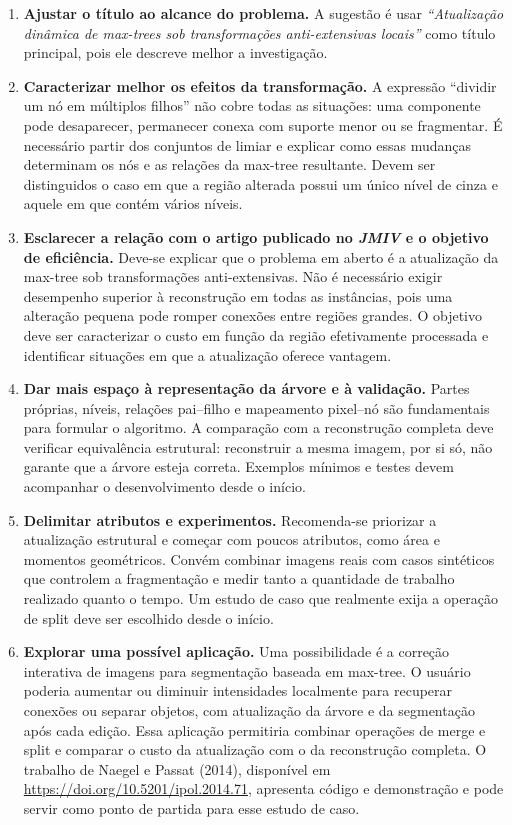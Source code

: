 \documentclass[11pt,a4paper]{article}
\theoremstyle{definition}
\begin{document}
\begin{enumerate}
  \item \textbf{Ajustar o título ao alcance do problema.} A sugestão é usar
  \emph{“Atualização dinâmica de max-trees sob transformações
  anti-extensivas locais”} como título principal, pois ele descreve melhor a
  investigação.

  \item \textbf{Caracterizar melhor os efeitos da transformação.} A expressão
  “dividir um nó em múltiplos filhos” não cobre todas as situações: uma
  componente pode desaparecer, permanecer conexa com suporte menor ou se
  fragmentar. É necessário partir dos conjuntos de limiar e explicar como
  essas mudanças determinam os nós e as relações da max-tree resultante.
  Devem ser distinguidos o caso em que a região alterada possui um único nível
  de cinza e aquele em que contém vários níveis.

  \item \textbf{Esclarecer a relação com o artigo publicado no \emph{JMIV} e
  o objetivo de eficiência.} Deve-se explicar que o problema em aberto é a
  atualização da max-tree sob transformações anti-extensivas. Não é necessário
  exigir desempenho superior à reconstrução em todas as instâncias, pois uma
  alteração pequena pode romper conexões entre regiões grandes. O objetivo
  deve ser caracterizar o custo em função da região efetivamente processada e
  identificar situações em que a atualização oferece vantagem.

  \item \textbf{Dar mais espaço à representação da árvore e à validação.}
  Partes próprias, níveis, relações pai--filho e mapeamento pixel--nó são
  fundamentais para formular o algoritmo. A comparação com a reconstrução
  completa deve verificar equivalência estrutural: reconstruir a mesma imagem,
  por si só, não garante que a árvore esteja correta. Exemplos mínimos e testes
  devem acompanhar o desenvolvimento desde o início.

  \item \textbf{Delimitar atributos e experimentos.} Recomenda-se priorizar a
  atualização estrutural e começar com poucos atributos, como área e momentos
  geométricos. Convém combinar imagens reais com casos sintéticos que controlem
  a fragmentação e medir tanto a quantidade de trabalho realizado quanto o
  tempo. Um estudo de caso que realmente exija a operação de split deve ser
  escolhido desde o início.

  \item \textbf{Explorar uma possível aplicação.} Uma possibilidade é a
  correção interativa de imagens para segmentação baseada em max-tree. O usuário
  poderia aumentar ou diminuir intensidades localmente para recuperar
  conexões ou separar objetos, com atualização da árvore e da segmentação após
  cada edição. Essa aplicação permitiria combinar operações de merge e split e
  comparar o custo da atualização com o da reconstrução completa. O trabalho
  de Naegel e Passat (2014), disponível em
  \href{https://doi.org/10.5201/ipol.2014.71}{https://doi.org/10.5201/ipol.2014.71}, apresenta código e demonstração
  e pode servir como ponto de partida para esse estudo de caso.


\end{enumerate}
\end{document}

